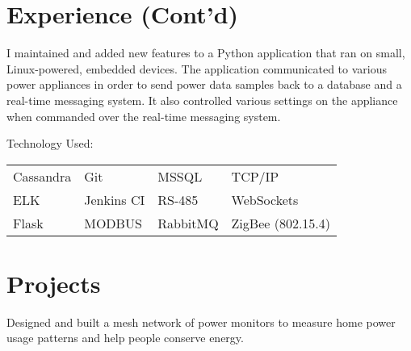 \documentclass[letterpaper]{deedy-resume} %
\begin{document}
\begin{minipage}[t]{0.99\textwidth} %


\section{Experience (Cont'd)}



I maintained and added new features to a Python application that ran on small, Linux-powered, embedded devices.
The application communicated to various power appliances in order to send power data samples back to a database and a real-time messaging system.
It also controlled various settings on the appliance when commanded over the real-time messaging system.
\sectionspace

Technology Used:\\
\begin{tabular}{llll}
Cassandra & Git & MSSQL & TCP/IP\\
ELK & Jenkins CI & RS-485 & WebSockets\\
Flask & MODBUS & RabbitMQ & ZigBee (802.15.4)\\
\end{tabular}

\sectionspace %


\section{Projects}


Designed and built a mesh network of power monitors to measure home power usage patterns and help people conserve energy.


\end{minipage}
\end{document}
